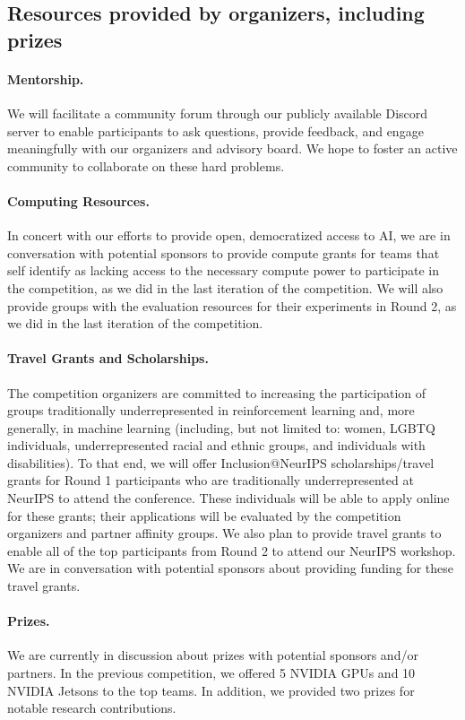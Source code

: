 \subsection{Resources provided by organizers, including prizes}
{
    \paragraph{Mentorship.}
    We will facilitate a community forum through our publicly available Discord server to enable participants to ask questions, provide feedback, and engage meaningfully with our organizers and advisory board. We hope to foster an active community to collaborate on these hard problems.

    \paragraph{Computing Resources.}
    In concert with our efforts to provide open, democratized access to AI, we are in conversation with potential sponsors to provide compute grants for teams that self identify as lacking access to the necessary compute power to participate in the competition, as we did in the last iteration of the competition.
    We will also provide groups with the evaluation resources for their experiments in Round 2, as we did in the last iteration of the competition.


    \paragraph{Travel Grants and Scholarships.} 
    The competition organizers are committed to increasing the participation of groups traditionally underrepresented in reinforcement learning and, more generally, in machine learning (including, but not limited to: women, LGBTQ individuals, underrepresented racial and ethnic groups, and individuals with disabilities). 
    To that end, we will offer Inclusion@NeurIPS scholarships/travel grants for Round 1 participants who are traditionally underrepresented at NeurIPS to attend the conference. 
    These individuals will be able to apply online for these grants; their applications will be evaluated by the competition organizers and partner affinity groups.
    We also plan to provide travel grants to enable all of the top participants from Round 2 to attend our NeurIPS workshop.
    We are in conversation with potential sponsors about providing funding for these travel grants.

    \paragraph{Prizes.}
    We are currently in discussion about prizes with potential sponsors and/or partners. In the previous competition, we offered 5 NVIDIA GPUs and 10 NVIDIA Jetsons to the top teams. In addition, we provided two prizes for notable research contributions.
}
